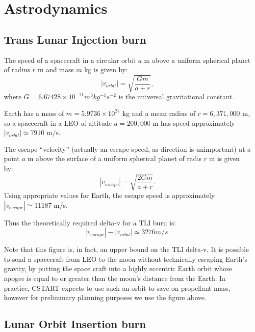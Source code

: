 \documentclass{report}
\begin{document}
\section{Astrodynamics}

\subsection{Trans Lunar Injection burn} \label{sec:tli}

The speed of a spacecraft in a circular orbit $a$ m above a uniform spherical planet of radius $r$ m and mass $m$ kg is given by:
\begin{equation} \label{eq:v_orbit}
|v_{orbit}| = \sqrt{\frac{Gm}{a+r}},
\end{equation}
where $G = 6.67428 \times 10^{-11} m^3 kg^{-1} s^{-2}$ is the universal gravitational constant.

Earth has a mass of $m = 5.9736 \times 10^{24}$ kg and a mean radius of $r = 6,371,000$ m, so a spacecraft in a LEO of altitude $a = 200,000$ m has speed approximately $|v_{orbit}| \simeq 7910$ m/s.

The escape ``velocity'' (actually an escape speed, as direction is unimportant) at a point $a$ m above the surface of a uniform spherical planet of radis $r$ m is given by:
\begin{equation} \label{eq:v_escape}
|v_{escape}| = \sqrt{\frac{2Gm}{a+r}}.
\end{equation}
Using appropriate values for Earth, the escape speed is approximately $|v_{escape}| \simeq 11187$ m/s.

Thus the theoretically required delta-v for a TLI burn is:
\begin{equation}
|v_{escape}| - |v_{orbit}| \simeq 3276 m/s.
\end{equation}

Note that this figure is, in fact, an upper bound on the TLI delta-v.  It is possible to send a spacecraft from LEO to the moon without technically escaping Earth's gravity, by putting the space craft into a highly eccentric Earth orbit whose apogee is equal to or greater than the moon's distance from the Earth.  In practice, CSTART expects to use such an orbit to save on propellant mass, however for preliminary planning purposes we use the figure above.

\subsection{Lunar Orbit Insertion burn}
\end{document}
